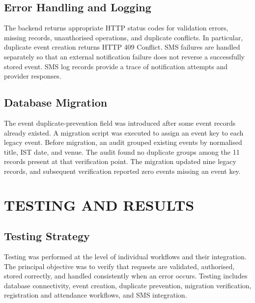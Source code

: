 \documentclass[12pt,a4paper,oneside]{report}
\begin{document}
\section{Error Handling and Logging}
The backend returns appropriate HTTP status codes for validation errors, missing records, unauthorised operations, and duplicate conflicts. In particular, duplicate event creation returns HTTP 409 Conflict. SMS failures are handled separately so that an external notification failure does not reverse a successfully stored event. SMS log records provide a trace of notification attempts and provider responses.

\section{Database Migration}
The event duplicate-prevention field was introduced after some event records already existed. A migration script was executed to assign an event key to each legacy event. Before migration, an audit grouped existing events by normalised title, IST date, and venue. The audit found no duplicate groups among the 11 records present at that verification point. The migration updated nine legacy records, and subsequent verification reported zero events missing an event key.

\chapter{TESTING AND RESULTS}

\section{Testing Strategy}
Testing was performed at the level of individual workflows and their integration. The principal objective was to verify that requests are validated, authorised, stored correctly, and handled consistently when an error occurs. Testing includes database connectivity, event creation, duplicate prevention, migration verification, registration and attendance workflows, and SMS integration.
\end{document}
